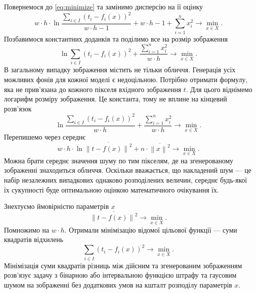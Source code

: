 Повернемося до \eqref{eq:minimize} та замінимо дисперсію на її оцінку
\begin{equation*}
  w \cdot h
  \cdot \ln{
    \frac{\sum\limits_{i \in I}\left( t_i - f_i\left( x \right) \right)^2}
         {w \cdot h - 1}}
  + w \cdot h - 1
  + \sum_{i = 1}^n x_i^2
  \to \min\limits_{x \in X}.
\end{equation*}
Позбавимося константних доданків та поділимо все на розмір зображення
\begin{equation*}
  \ln{\sum_{i \in I} \left( t_i - f_i\left( x \right) \right)^2}
  + \frac{\sum\limits_{i = 1}^n x_i^2}{w \cdot h}
  \to \min\limits_{x \in X}.
\end{equation*}
В загальному випадку зображення містить не тільки обличчя.
Генерація усіх можливих фонів для кожної моделі є недоцільною.
Потрібно отримати формулу,
яка не прив'язана до кожного пікселя вхідного зображення $t$.
Для цього віднімемо логарифм розміру зображення.
Це константа, тому не вплине на кінцевий розв'язок
\begin{equation*}
  \ln{\frac{\sum\limits_{i \in I} \left( t_i - f_i\left( x \right) \right)^2}
           {w \cdot h}}
  + \frac{\sum\limits_{i = 1}^n x_i^2}{w \cdot h}
  \to \min\limits_{x \in X}.
\end{equation*}
Перепишемо через середнє
\begin{equation*}
  w \cdot h \cdot \ln{\overline{\left\| t - f\left( x \right) \right\|^2}}
  + n \cdot \overline{\left\| x \right\|^2}
  \to \min\limits_{x \in X}.
\end{equation*}
Можна брати середнє значення шуму по тим пікселям,
де на згенерованому зображенні знаходиться обличчя.
Оскільки вважається, що накладений шум ---
це набір незалежних випадкових однаково розподілених величин,
середнє будь-якої їх сукупності
буде оптимальною оцінкою математичного очікування їх.

Знехтуємо ймовірністю параметрів $x$
\begin{equation*}
  \overline{\left\| t - f\left( x \right) \right\|^2}
  \to \min\limits_{x \in X}.
\end{equation*}
Помножимо на $w \cdot h$.
Отримали мінімізацію відомої цільової функції --- суми квадратів відхилень
\begin{equation*}
  \sum_{i \in I} \left( t_i - f_i\left( x \right) \right)^2
  \to \min\limits_{x \in X}.
\end{equation*}
Мінімізація суми квадратів різниць між дійсним та згенерованим зображенням
розв'язує задачу з бінарною або інтервальною функцією штрафу
та гаусовим шумом на зображенні без додаткових умов
на кшталт розподілу параметрів $x$.

